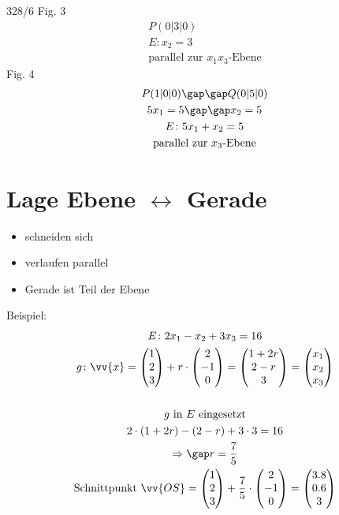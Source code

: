 \begin{exercise}{328/6}
  Fig. 3
  \begin{gather*}
    P(0|3|0) \\
    E \colon x_2 = 3 \\
    \text{parallel zur $x_1x_3$-Ebene}
  \end{gather*}
  Fig. 4
  \begin{gather*}
    P(1|0|0) \gap\gap Q(0|5|0) \\
    5x_1 = 5 \gap\gap x_2 = 5 \\
    E \colon 5x_1 + x_2 = 5 \\
    \text{parallel zur $x_3$-Ebene}
  \end{gather*}
\end{exercise}
\section{Lage Ebene $\leftrightarrow$ Gerade}
\begin{itemize}
  \item schneiden sich
  \item verlaufen parallel
  \item Gerade ist Teil der Ebene
\end{itemize}
Beispiel:
\begin{gather*}
  E \colon 2x_1 - x_2 + 3x_3 = 16 \\
  g \colon \vv{x} = \begin{pmatrix}1 \\ 2 \\ 3\end{pmatrix} + r \cdot \begin{pmatrix}2 \\ -1 \\ 0\end{pmatrix} = \begin{pmatrix}1 + 2r \\ 2 - r \\ 3\end{pmatrix} = \begin{pmatrix}x_1 \\ x_2 \\ x_3\end{pmatrix} \\\\
  \text{$g$ in $E$ eingesetzt} \\
  2 \cdot (1 + 2r) - (2 - r) + 3 \cdot 3 = 16 \\
  \Rightarrow\gap r = \frac{7}{5} \\
  \text{Schnittpunkt } \vv{OS} = \begin{pmatrix}1 \\ 2 \\ 3\end{pmatrix} + \frac{7}{5} \cdot \begin{pmatrix}2 \\ -1 \\ 0\end{pmatrix} = \begin{pmatrix}3.8 \\ 0.6 \\ 3\end{pmatrix}
\end{gather*}
